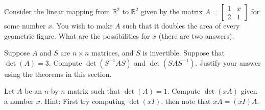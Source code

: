 \begin{exercise}
Consider the linear mapping from ${\mathbb R}^2$ to ${\mathbb R}^2$
given by the  matrix
$A = \begin{bmatrix}
1 & x \\
2 & 1
\end{bmatrix}$
for some number $x$.  You wish to make $A$ such that it doubles the area of
every geometric figure.  What are the possibilities for $x$ (there are two
answers).
\end{exercise}

\begin{exercise}
Suppose $A$ and $S$ are $n \times n$ matrices, and $S$ is invertible.
Suppose that $\det(A) = 3$.  Compute $\det(S^{-1}AS)$ and 
$\det(SAS^{-1})$.  Justify your answer using the theorems in this section.
\end{exercise}

\begin{exercise}
Let $A$ be an $n$-by-$n$ matrix such that $\det(A)=1$.
Compute $\det(x A)$ given a number $x$.  Hint: First try computing
$\det(xI)$, then note that $xA = (xI)A$.
\end{exercise}

\setcounter{exercise}{100}

